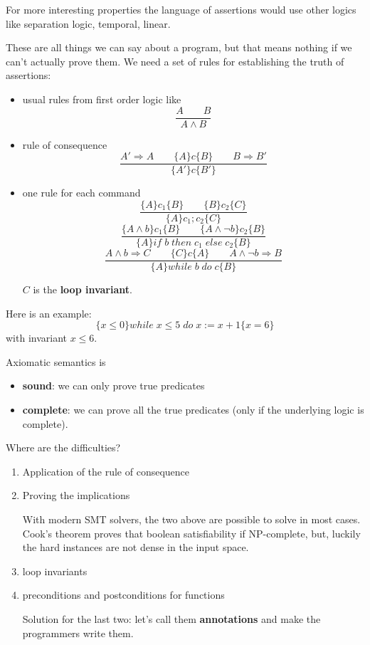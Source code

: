 \documentclass[12pt]{article}
\begin{document}
For more interesting properties the language of assertions would use other logics like separation logic, temporal, linear.

These are all things we can say about a program, but that means nothing if we can't actually prove them. We need a set of rules for establishing the truth of assertions:
\begin{itemize}
\item usual rules from first order logic like 
\[
\frac{A \qquad B}{A \wedge B}
\]
\item rule of consequence
\[
\frac{A'\Rightarrow A \qquad \{A\}c\{B\} \qquad B \Rightarrow B'} { \{A'\}c\{B'\}}
\]
\item one rule for each command
\[
\frac{\{A\}c_1\{B\} \qquad \{B\}c_2\{C\}}{\{A\}c_1;c_2\{C\}}
\]
\[
\frac{ \{A \wedge b \}c_1 \{B\} \qquad \{A \wedge \neg b \} c_2 \{B\} }{\{A\}if\;b\;then\;c_1\;else\;c_2\{B\}}
\]
\[
\frac{ A \wedge b \Rightarrow C \qquad \{C\}c\{A\} \qquad A \wedge \neg b \Rightarrow B }{ \{A\}while\;b\;do\;c\{B\}}
\]

$C$ is the \textbf{loop invariant}.
\end{itemize}

Here is an example:
\[
\{x \leq 0\} while \; x \leq 5 \; do \; x := x + 1 \{ x = 6 \}
\]
with invariant $x \leq 6$.

Axiomatic semantics is 
\begin{itemize}
\item\textbf{sound}: we can only prove true predicates 
\item \textbf{complete}: we can prove all the true predicates (only if the underlying logic is complete). 
\end{itemize}

Where are the difficulties?
\begin{enumerate}
\item Application of the rule of consequence 
\item Proving the implications 

With modern SMT solvers, the two above are possible to solve in most cases. Cook's theorem proves that boolean satisfiability if NP-complete, but, luckily the hard instances are not dense in the input space. 

\item loop invariants 
\item preconditions and postconditions for functions

Solution for the last two: let's call them \textbf{annotations} and make the programmers write them. 
\end{enumerate}
\end{document}
